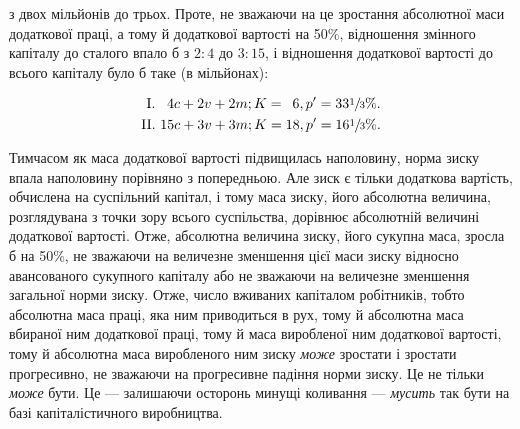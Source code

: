 \parcont{}  %
з двох мільйонів до трьох. Проте, не зважаючи на це зростання
абсолютної маси додаткової праці, а тому й додаткової
вартості на 50\%, відношення змінного капіталу до сталого
впало б з $2 : 4$ до $3 : 15$, і відношення додаткової вартості до
всього капіталу було б таке (в мільйонах):

\begin{gather*}
\text{\phantom{I}I. }\phantom{1}4c + 2v + 2m; K = \phantom{1}6, p' = 33\sfrac{1}{3}\%.\\
\text{II. }15c + 3v + 3m; K = 18, p' = 16\sfrac{1}{3}\%.
\end{gather*}

\noindent{}Тимчасом як маса додаткової вартості підвищилась наполовину,
норма зиску впала наполовину порівняно з попередньою.
Але зиск є тільки додаткова вартість, обчислена на суспільний
капітал, і тому маса зиску, його абсолютна величина, розглядувана
з точки зору всього суспільства, дорівнює абсолютній величині
додаткової вартості. Отже, абсолютна величина зиску, його
сукупна маса, зросла б на 50\%, не зважаючи на величезне зменшення
цієї маси зиску відносно авансованого сукупного капіталу
або не зважаючи на величезне зменшення загальної норми зиску.
Отже, число вживаних капіталом робітників, тобто абсолютна
маса праці, яка ним приводиться в рух, тому й абсолютна маса
вбираної ним додаткової праці, тому й маса виробленої ним додаткової
вартості, тому й абсолютна маса виробленого ним зиску
\emph{може} зростати і зростати прогресивно, не зважаючи на прогресивне
падіння норми зиску. Це не тільки \emph{може} бути. Це — залишаючи
осторонь минущі коливання — \emph{мусить} так бути на базі
капіталістичного виробництва.

